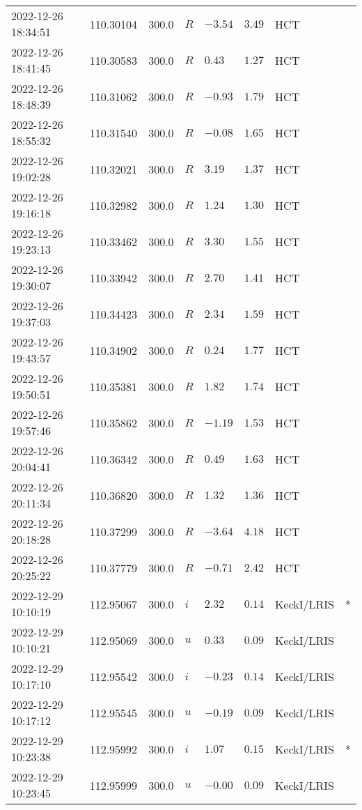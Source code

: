 \documentclass{nature_plusfigure}
\begin{document}
\begin{supplement}
\begin{center}
\begin{longtable}{llllllll}
2022-12-26 18:34:51 & 110.30104 & 300.0 & $R$ & $-3.54$ & $3.49$ & HCT &  \\ 
2022-12-26 18:41:45 & 110.30583 & 300.0 & $R$ & $0.43$ & $1.27$ & HCT &  \\ 
2022-12-26 18:48:39 & 110.31062 & 300.0 & $R$ & $-0.93$ & $1.79$ & HCT &  \\ 
2022-12-26 18:55:32 & 110.31540 & 300.0 & $R$ & $-0.08$ & $1.65$ & HCT &  \\ 
2022-12-26 19:02:28 & 110.32021 & 300.0 & $R$ & $3.19$ & $1.37$ & HCT &  \\ 
2022-12-26 19:16:18 & 110.32982 & 300.0 & $R$ & $1.24$ & $1.30$ & HCT &  \\ 
2022-12-26 19:23:13 & 110.33462 & 300.0 & $R$ & $3.30$ & $1.55$ & HCT &  \\ 
2022-12-26 19:30:07 & 110.33942 & 300.0 & $R$ & $2.70$ & $1.41$ & HCT &  \\ 
2022-12-26 19:37:03 & 110.34423 & 300.0 & $R$ & $2.34$ & $1.59$ & HCT &  \\ 
2022-12-26 19:43:57 & 110.34902 & 300.0 & $R$ & $0.24$ & $1.77$ & HCT &  \\ 
2022-12-26 19:50:51 & 110.35381 & 300.0 & $R$ & $1.82$ & $1.74$ & HCT &  \\ 
2022-12-26 19:57:46 & 110.35862 & 300.0 & $R$ & $-1.19$ & $1.53$ & HCT &  \\ 
2022-12-26 20:04:41 & 110.36342 & 300.0 & $R$ & $0.49$ & $1.63$ & HCT &  \\ 
2022-12-26 20:11:34 & 110.36820 & 300.0 & $R$ & $1.32$ & $1.36$ & HCT &  \\ 
2022-12-26 20:18:28 & 110.37299 & 300.0 & $R$ & $-3.64$ & $4.18$ & HCT &  \\ 
2022-12-26 20:25:22 & 110.37779 & 300.0 & $R$ & $-0.71$ & $2.42$ & HCT &  \\ 
2022-12-29 10:10:19 & 112.95067 & 300.0 & $i$ & $2.32$ & $0.14$ & KeckI/LRIS & * \\ 
2022-12-29 10:10:21 & 112.95069 & 300.0 & $u$ & $0.33$ & $0.09$ & KeckI/LRIS &  \\ 
2022-12-29 10:17:10 & 112.95542 & 300.0 & $i$ & $-0.23$ & $0.14$ & KeckI/LRIS &  \\ 
2022-12-29 10:17:12 & 112.95545 & 300.0 & $u$ & $-0.19$ & $0.09$ & KeckI/LRIS &  \\ 
2022-12-29 10:23:38 & 112.95992 & 300.0 & $i$ & $1.07$ & $0.15$ & KeckI/LRIS & * \\ 
2022-12-29 10:23:45 & 112.95999 & 300.0 & $u$ & $-0.00$ & $0.09$ & KeckI/LRIS &  \\ 

\end{longtable}
\end{center}
\end{supplement}
\end{document}
